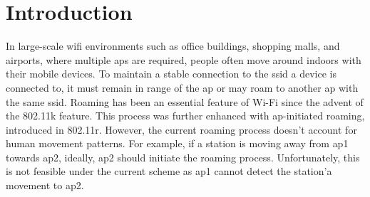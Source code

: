 \chapter{Introduction}\label{sec:intro}




In large-scale \ac{wifi} environments such as office buildings, shopping malls, and airports, where multiple \acp{ap} are required, people often move around indoors with their mobile devices.
To maintain a stable connection to the \ac{ssid} a device is connected to, it must remain in range of the \ac{ap} or may roam to another \ac{ap} with the same \ac{ssid}.
Roaming has been an essential feature of Wi-Fi since the advent of the 802.11k\cite{802.11k} feature.
This process was further enhanced with \ac{ap}-initiated roaming, introduced in 802.11r\cite{802.11r}.
However, the current roaming process doesn't account for human movement patterns. 
For example, if a station is moving away from \ac{ap}1 towards \ac{ap}2, ideally, \ac{ap}2 should initiate the roaming process.
Unfortunately, this is not feasible under the current scheme as \ac{ap}1 cannot detect the station'a movement to \ac{ap}2.

